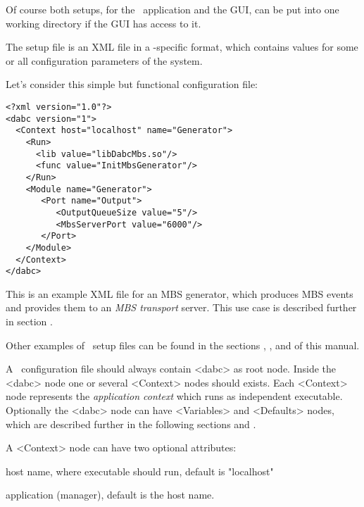 Of course both setups, for the \dabc\ application and the GUI, can be
put into one working directory if the GUI has access to it.




The setup file is an XML file in a \dabc-specific format, 
which contains values for some or all configuration parameters of the system. 

Let's consider this simple but functional configuration file:

\begin{small}
\begin{verbatim}
<?xml version="1.0"?>
<dabc version="1">
  <Context host="localhost" name="Generator">
    <Run>
      <lib value="libDabcMbs.so"/>
      <func value="InitMbsGenerator"/>
    </Run>
    <Module name="Generator">
       <Port name="Output">
          <OutputQueueSize value="5"/>
          <MbsServerPort value="6000"/>
       </Port>
    </Module>
  </Context>
</dabc>
\end{verbatim}
\end{small}

This is an example XML file for an MBS generator, which produces 
MBS events and provides them to an {\em MBS transport} server. 
This use case is described further in section .

Other examples of \dabc\ setup files can be found in the sections
, , and 
of this manual.


A \dabc\ configuration file should always contain <dabc> as root node. 
Inside the <dabc> node one or several <Context> nodes should exists.
Each <Context> node represents the {\em application context} which runs as
independent executable. 
Optionally the <dabc> node can have <Variables> and <Defaults> nodes, 
which are described further in the following sections  
and .

A <Context> node can have two optional attributes:
\bdes
\item["host"] host name, where executable should run, default is "localhost"
\item["name"] application (manager), default is the host name.
\edes

